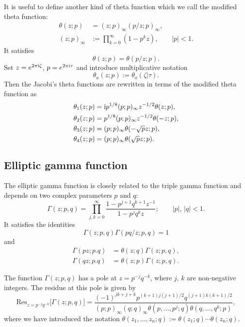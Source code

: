It is useful to define another kind of theta function which we call the modified theta function:
\begin{align}
    \theta(z;p) &= (z;p)_{\infty} (p/z;p)_{\infty}, \\
    (z;p)_{\infty} &:= \prod_{k=0}^{\infty} (1-p^k z), \qquad |p|<1.
\end{align}
It satisfies\begin{equation}
    \theta(z;p) = \theta(p/z;p).
\end{equation}
Set $z=e^{2\pi\mathrm{i}\zeta}$, $p=e^{2\pi\mathrm{i}\tau}$ and introduce multiplicative notation
\begin{equation}
    \theta_a(z;p) := \theta_a(\zeta|\tau).
\end{equation}
Then the Jacobi's theta functions are rewritten in terms of the modified theta function as
\begin{align}
    \theta_1(z;p) &= \mathrm{i} p^{1/8} (p;p)_{\infty} z^{-1/2} \theta(z;p), \\
    \theta_2(z;p) &= p^{1/8} (p;p)_{\infty} z^{-1/2} \theta(-z;p), \\
    \theta_3(z;p) &= (p;p)_{\infty} \theta(-\sqrt{p}z;p), \\
    \theta_4(z;p) &= (p;p)_{\infty} \theta(\sqrt{p}z;p).
\end{align}





\subsection{Elliptic gamma function}

The elliptic gamma function is closely related to the triple gamma function
and depends on two complex parameters $p$ and $q$:
\begin{equation}
    \Gamma(z;p,q) =
        \prod_{j,k=0}^{\infty} \frac{1-p^{j+1}q^{k+1}z^{-1}}{1-p^j q^k z};
    \qquad
        |p|,\,|q| < 1.
\end{equation}
It satisfies the identities
\begin{equation}
    \Gamma(z;p,q) \Gamma(pq/z;p,q) = 1
\end{equation}
and
\begin{align}
    \Gamma(pz;p.q) &= \theta(z;q) \Gamma(z;p,q), \\
    \Gamma(qz;p.q) &= \theta(z;p) \Gamma(z;p,q).
\end{align}

The function $\Gamma(z;p,q)$ has a pole at $z=p^{-j}q^{-k}$, where $j,\,k$ are non-negative integers.
The residue at this pole is given by
\begin{equation}
    \mathrm{Res}_{z=p^{-j}q^{-k}} \big[ \Gamma(z;p,q) \big]
    = \frac{(-1)^{jk+j+k}p^{(k+1)j(j+1)/2}q^{(j+1)k(k+1)/2}}
    {(p;p)_{\infty} (q;q)_{\infty} \theta(p,\ldots,p^j;q)\theta(q,\ldots,q^k;p)},
\label{eq:gamma_residue}
\end{equation}
where we have introduced the notation $\theta(z_1,\ldots,z_n;q):=\theta(z_1;q)\cdots\theta(z_n;q)$.

